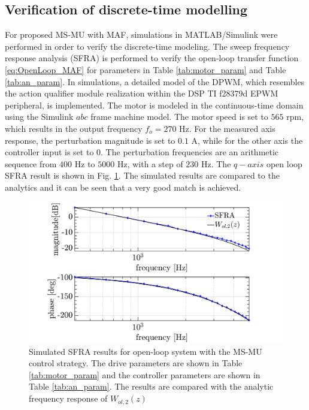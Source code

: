 \documentclass[conference]{IEEEtran}
\begin{document}
\subsection{Verification of discrete-time modelling}
For proposed MS-MU with MAF, simulations in MATLAB/Simulink were performed in order to verify the discrete-time modeling. 
The sweep frequency response analysis (SFRA) is performed to verify the open-loop transfer function \eqref{eq:OpenLoop_MAF} for parameters in Table \ref{tab:motor_param} and Table \ref{tab:an_param}. In simulations, a detailed model of the DPWM, which resembles the action qualifier module realization within the DSP TI f28379d EPWM peripheral, is implemented. The motor is modeled in the continuous-time domain using the Simulink $abc$ frame machine model. The motor speed is set to $565$ rpm, which results in the output frequency $f_o = 270$ Hz.
For the measured axis response, the perturbation magnitude is set to $0.1$ A, while for the other axis the controller input is set to $0$. The perturbation frequencies are an arithmetic sequence from $400$ Hz to $5000$ Hz, with a step of $230$ Hz. The $q-axis$ open loop SFRA result is shown in Fig. \ref{fig:MSMUmaf_olfra}. The simulated results are compared to the analytics and it can be seen that a very good match is achieved.

\begin{figure}[t!]
    \centerline{\includegraphics[width=1\linewidth]{figures/ivan figs/MSMU_OL_SFRA.png}}
    \caption{Simulated SFRA results for open-loop system with the MS-MU control strategy. The drive parameters are shown in Table \ref{tab:motor_param} and the controller parameters are shown in Table \ref{tab:an_param}. The results are compared with the analytic frequency response of $W_{ol,2}(z)$ }
    \label{fig:MSMUmaf_olfra} 
\end{figure}
\end{document}
